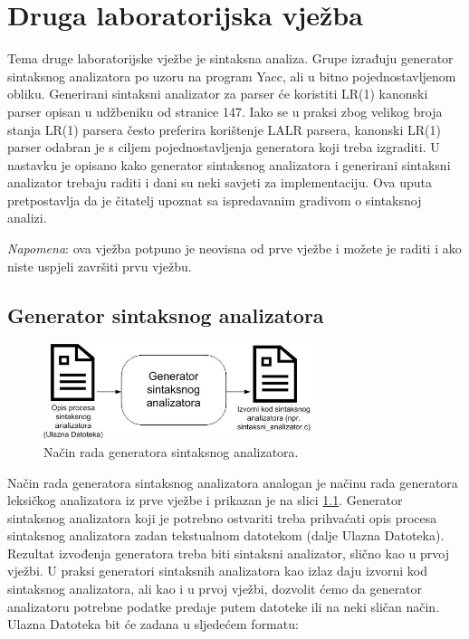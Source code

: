 \documentclass[times, 12pt, utf8]{book}
\begin{document}
\chapter{Druga laboratorijska vježba}\label{chap:II}

Tema druge laboratorijske vježbe je sintaksna analiza.
Grupe izrađuju generator sintaksnog analizatora po uzoru na program Yacc, ali u bitno pojednostavljenom obliku.
Generirani sintaksni analizator za parser će koristiti LR(1) kanonski parser opisan u udžbeniku od stranice 147.
Iako se u praksi zbog velikog broja stanja LR(1) parsera često preferira korištenje LALR parsera, kanonski LR(1) parser odabran je s ciljem pojednostavljenja generatora koji treba izgraditi.
U nastavku je opisano kako generator sintaksnog analizatora i generirani sintaksni analizator trebaju raditi i dani su neki savjeti za implementaciju.
Ova uputa pretpostavlja da je čitatelj upoznat sa ispredavanim gradivom o sintaksnoj analizi.

\emph{Napomena}: ova vježba potpuno je neovisna od prve vježbe i možete je raditi i ako niste uspjeli završiti prvu vježbu.

\section{Generator sintaksnog analizatora}

\begin{figure}[htb!]
\centering
\includegraphics[width=0.7\textwidth]{slike/generator-sintaksnog-analizatora.jpg}
\caption{Način rada generatora sintaksnog analizatora.}
\label{fig:generator-sintaksnog-analizatora}
\end{figure}

Način rada generatora sintaksnog analizatora analogan je načinu rada generatora leksičkog analizatora iz prve vježbe i prikazan je na slici \ref{fig:generator-sintaksnog-analizatora}.
Generator sintaksnog analizatora koji je potrebno ostvariti treba prihvaćati opis procesa sintaksnog analizatora zadan tekstualnom datotekom (dalje Ulazna Datoteka).
Rezultat izvođenja generatora treba biti sintaksni analizator, slično kao u prvoj vježbi.
U praksi generatori sintaksnih analizatora kao izlaz daju izvorni kod sintaksnog analizatora, ali kao i u prvoj vježbi, dozvolit ćemo da generator analizatoru potrebne podatke predaje putem datoteke ili na neki sličan način.
Ulazna Datoteka bit će zadana u sljedećem formatu: 
\end{document}
